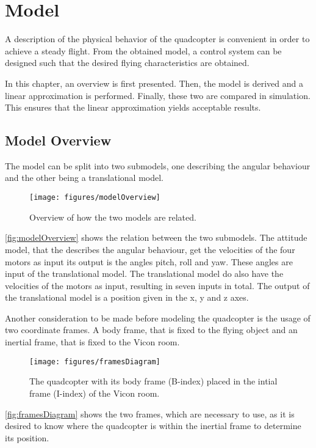 \chapter{Model}\label{chap:Model}
A description of the physical behavior of the quadcopter is convenient in order to achieve a steady flight. From the obtained model, a control system can be designed such that the desired flying characteristics are obtained.

In this chapter, an overview is first presented. Then, the model is derived and a linear approximation is performed. Finally, these two are compared in simulation. This ensures that the linear approximation yields acceptable results.

\section{Model Overview} \label{sec:ModelOverview}
The model can be split into two submodels, one describing the angular behaviour and the other being a translational model.
\begin{figure}[H]
    \centering
    \texttt{[image: figures/modelOverview]}
    \caption{Overview of how the two models are related.}
    \label{fig:modelOverview}
\end{figure}
%
\autoref{fig:modelOverview} shows the relation between the two submodels. The attitude model, that the describes the angular behaviour, get the velocities of the four motors as input its output is the angles pitch, roll and yaw. These angles are input of the translational model. The translational model do also have the velocities of the motors as input, resulting in seven inputs in total. The output of the translational model is a position given in the x, y and z axes.

Another consideration to be made before modeling the quadcopter is the usage of two coordinate frames. A body frame, that is fixed to the flying object and an inertial frame, that is fixed to the Vicon room. 
%
\begin{figure}[H]
    \centering
    \texttt{[image: figures/framesDiagram]}
    \caption{The quadcopter with its body frame (B-index) placed in the intial frame (I-index) of the Vicon room. }
    \label{fig:framesDiagram}
\end{figure}

\autoref{fig:framesDiagram} shows the two frames, which are necessary to use, as it is desired to know where the quadcopter is within the inertial frame to determine its position. 

